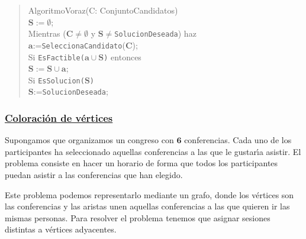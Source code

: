\documentclass[twoside]{report}
\newcommand{\bs}[1]{\boldsymbol{#1}}
\begin{document}
        \begin{quotation}
        AlgoritmoVoraz(C: ConjuntoCandidatos) \\[1ex]
        $\bs{S:=\emptyset}$; \\[1ex]
        \textsf{Mientras} ($\bs{C\neq\emptyset}$ \textsf{y} $\bs{S\neq}$\texttt{SolucionDeseada}) \textsf{haz} \\[1ex]
            \hspace*{1cm} $\bs{a}$:=\texttt{SeleccionaCandidato}($\bs{C}$); \\[1ex]
            \hspace*{1cm} \textsf{Si} \texttt{EsFactible($\bs{a\cup S}$)} \textsf{entonces} \\[1ex]
                \hspace*{2cm} $\bs{S:=S\cup a}$; \\[1ex]
                \hspace*{2cm} \textsf{Si} \texttt{EsSolucion($\bs{S}$)} \\[1ex]
                    \hspace*{3cm} $\bs{S}$:=\texttt{SolucionDeseada}; \\[1ex]
        \end{quotation}



\subsubsection{\underline{Coloraci\'{o}n de v\'{e}rtices}}
\vspace{0.2cm}

Supongamos que organizamos un congreso con $\bs{6}$ conferencias. Cada uno de los participantes ha seleccionado aquellas conferencias a las que le
gustar\'{\i}a asistir. El problema consiste en hacer un horario de forma que todos los participantes puedan asistir a las conferencias que han elegido.
\vspace{0.2cm}

Este problema podemos representarlo mediante un grafo, donde los v\'{e}rtices son las conferencias y las aristas unen aquellas con\-fe\-ren\-cias a las que quieren ir las mismas personas. Para resolver el problema tenemos que asignar sesiones distintas a v\'{e}rtices adyacentes.
\end{document}
